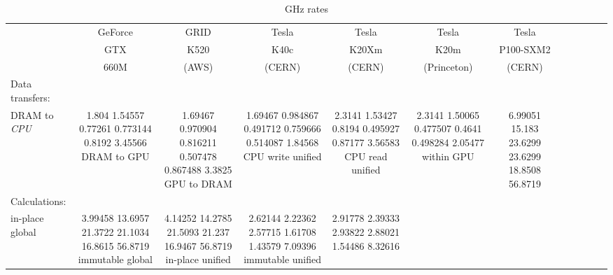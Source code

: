 \documentclass[12pt]{article}
\begin{document}
\begin{table}
\caption{\label{gpu-results} GHz rates}

\begin{center}
\begin{tabular}{l c c c c c c}
                  &  GeForce & GRID     & Tesla  & Tesla  & Tesla       & Tesla     \\
                  &  GTX     & K520     & K40c   & K20Xm  & K20m        & P100-SXM2 \\
                  &  660M    & (AWS)    & (CERN) & (CERN) & (Princeton) & (CERN)    \\
Data transfers:   &          &          &        &        &             &           \\\hline
DRAM to {\it CPU} & 1.804 1.54557 0.77261 0.773144 0.8192 3.45566       
DRAM to GPU       & 1.69467 0.970904 0.816211 0.507478 0.867488 3.3825  
GPU to DRAM       & 1.69467 0.984867 0.491712 0.759666 0.514087 1.84568 
CPU write unified & 2.3141 1.53427 0.8194 0.495927 0.87177 3.56583      
CPU read unified  & 2.3141 1.50065 0.477507 0.4641 0.498284 2.05477     
within GPU        & 6.99051 15.183 23.6299 23.6299 18.8508 56.8719      
                  &          &          &        &        &             &           \\
Calculations:     &          &          &        &        &             &           \\\hline
in-place global   & 3.99458 13.6957 21.3722 21.1034 16.8615 56.8719
immutable global  & 4.14252 14.2785 21.5093 21.237 16.9467 56.8719 
in-place unified  & 2.62144 2.22362 2.57715 1.61708 1.43579 7.09396
immutable unified & 2.91778 2.39333 2.93822 2.88021 1.54486 8.32616
\end{tabular}
\end{center}
\end{table}
\end{document}

